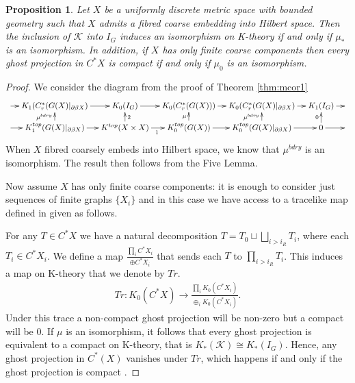 \documentclass[preprint]{elsarticle}
\theoremstyle{plain}
\newtheorem{proposition}[theorem]{Proposition}%
\theoremstyle{definition}%
\theoremstyle{remark}%
\begin{document}
\begin{proposition}\label{thm:MT2}
Let $X$ be a uniformly discrete metric space with bounded geometry such that $X$ admits a fibred coarse embedding into Hilbert space. Then the inclusion of $\mathcal{K}$ into $I_{G}$ induces an isomorphism on K-theory if and only if $\mu_{*}$ is an isomorphism. In addition, if $X$ has only finite coarse components then every ghost projection in $C^{*}X$ is compact if and only if $\mu_{0}$ is an isomorphism.
\end{proposition}
\begin{proof}
We consider the diagram from the proof of Theorem \ref{thm:mcor1}
$$
\xymatrix@=1em{
\ar[r] & K_{1}(C^{*}_{r}(G(X)|_{\partial\beta X}) \ar[r] & K_{0}(I_{G}) \ar[r]& K_{0}(C^{*}_{r}(G(X))) \ar[r]& K_{0}(C^{*}_{r}(G(X)|_{\partial\beta X})\ar[r] & K_{1}(I_{G}) \ar[r] & \\
\ar[r] & K_{1}^{top}(G(X)|_{\partial\beta X}) \ar[r] \ar[u]^{\mu^{bdry}}& K^{top}(X \times X) \ar[r]_{1}\ar[u]_{2}& K_{0}^{top}(G(X)) \ar[r]\ar[u]^{\mu}& K_{0}^{top}(G(X)|_{\partial\beta X}) \ar[r]\ar[u]^{\mu^{bdry}}& 0\ar[u]^{0} \ar[r] &
}
$$
When $X$ fibred coarsely embeds into Hilbert space, we know that $\mu^{bdry}$ is an isomorphism. The result then follows from the Five Lemma.

Now assume $X$ has only finite coarse components: it is enough to consider just sequences of finite graphs $\lbrace X_{i}\rbrace$ and in this case we have access to a tracelike map defined in \cite{higsonpreprint, explg1} given as follows.

For any $T \in C^{*}X$ we have a natural decomposition $T= T_{0} \sqcup \bigsqcup_{i>i_{R}}T_{i}$, where each $T_{i} \in C^{*}X_{i}$. We define a map $\frac{\prod_{i}C^{*}X_{i}}{\oplus C^{*}X_{i}}$ that sends each $T$ to $\prod_{i>i_{R}} T_{i}$. This induces a map on K-theory that we denote by $Tr$.
\begin{eqnarray*}
Tr:K_{0}(C^{*}X) \rightarrow \frac{\prod_{i}K_{0}(C^{*}X_{i})}{\oplus_{i}K_{0}(C^{*}X_{i})}.
\end{eqnarray*}
Under this trace a non-compact ghost projection will be non-zero but a compact will be $0$. If $\mu$ is an isomorphism, it follows that every ghost projection is equivalent to a compact on K-theory, that is $K_{*}(\mathcal{K}) \cong K_{*}(I_{G})$. Hence, any ghost projection in $C^{*}(X)$ vanishes under $Tr$, which happens if and only if the ghost projection is compact \cite{explg1}.
\end{proof}
\end{document}
